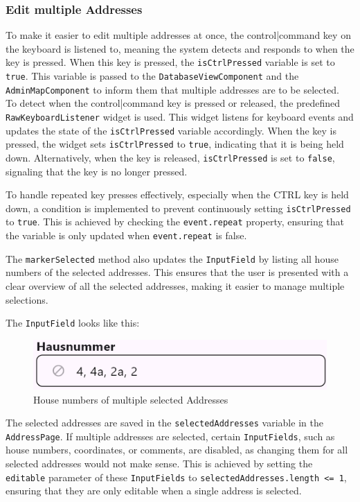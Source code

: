 \subsubsection{Edit multiple Addresses}
\label{fig:Edit multiple addresses}
To make it easier to edit multiple addresses at once, the control|command key on the keyboard is listened to, meaning the system detects and responds to when the key is pressed. When this key is pressed, the \texttt{isCtrlPressed} variable is set to \texttt{true}. This variable is passed to the \texttt{DatabaseViewComponent} and the \texttt{AdminMapComponent} to inform them that multiple addresses are to be selected.\\


To detect when the control|command key is pressed or released, the predefined \texttt{RawKeyboardListener} widget is used. This widget listens for keyboard events and updates the state of the \texttt{isCtrlPressed} variable accordingly. When the key is pressed, the widget sets \texttt{isCtrlPressed} to \texttt{true}, indicating that it is being held down. Alternatively, when the  key is released, \texttt{isCtrlPressed} is set to \texttt{false}, signaling that the key is no longer pressed.

To handle repeated key presses effectively, especially when the CTRL key is held down, a condition is implemented to prevent continuously setting \texttt{isCtrlPressed} to \texttt{true}. This is achieved by checking the \texttt{event.repeat} property, ensuring that the variable is only updated when \texttt{event.repeat} is false.


The \texttt{markerSelected} method also updates the \texttt{InputField} by listing all house numbers of the selected addresses. This ensures that the user is presented with a clear overview of all the selected addresses, making it easier to manage multiple selections.

The \texttt{InputField} looks like this:
\begin{figure}[H]
    \centering
    \includegraphics[width=0.6\linewidth]{images/AdminPanel/listedHouseNumbersInputField.png}
    \caption{House numbers of multiple selected Addresses}
\end{figure}

The selected addresses are saved in the \texttt{selectedAddresses} variable in the \texttt{AddressPage}. If multiple addresses are selected, certain \texttt{InputFields}, such as house numbers, coordinates, or comments, are disabled, as changing them for all selected addresses would not make sense. This is achieved by setting the \texttt{editable} parameter of these \texttt{InputFields} to \texttt{selectedAddresses.length <= 1}, ensuring that they are only editable when a single address is selected.


